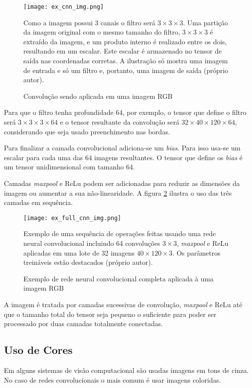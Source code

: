\begin{figure}[!htb]
	\centering
	\texttt{[image: ex\_cnn\_img.png]}
	\caption{Convolução sendo aplicada em uma imagem RGB}
	\label{fig:ex_cnn_img}
	Como a imagem possui 3 canais o filtro será $3 \times 3 \times 3$.
	Uma partição da imagem original com o mesmo tamanho do filtro,
	$3 \times 3 \times 3$ é extraído da imagem, e um
	produto interno é realizado entre os dois, resultando em um escalar. Este
	escalar é armazenado no tensor de saída nas coordenadas corretas. A
	ilustração só mostra uma imagem de entrada e só um filtro e, portanto, uma
	imagem de saída (próprio autor).
\end{figure}

Para que o filtro tenha profundidade 64, por exemplo, o tensor que define o
filtro será $3 \times 3 \times 3 \times 64$ e o tensor resultante da
convolução será $32 \times 40 \times 120 \times 64$,
considerando que seja usado preenchimento nas bordas.

Para finalizar a camada convolucional adiciona-se um \emph{bias}. Para
isso usa-se um escalar para cada uma das 64 imagens resultantes. O
tensor que define os \emph{bias} é um tensor unidimensional com tamanho 64.

Camadas \emph{maxpool} e ReLu podem ser adicionadas para reduzir as
dimensões da imagem ou aumentar a sua não-linearidade. A figura
\ref{fig:ex_full_cnn_img} ilustra o uso das três camadas em sequência.

\begin{figure}[!htb]
	\centering
	\texttt{[image: ex\_full\_cnn\_img.png]}
	\caption{Exemplo de rede neural convolucional completa aplicada à uma imagem
	RGB}
	\label{fig:ex_full_cnn_img}
	Exemplo de uma sequência de operações feitas usando uma rede neural
	convolucional incluindo 64 convoluções $3 \times 3$, \emph{maxpool} e
	ReLu aplicadas em uma
	lote de 32 imagens $40 \times 120 \times 3$. Os parâmetros treináveis
	estão destacados (próprio autor).
\end{figure}

A imagem é tratada por camadas sucessivas de convolução, \emph{maxpool} e
ReLu até que
o tamanho total do tensor seja pequeno o suficiente para poder ser processado
por duas camadas totalmente conectadas. 

\subsection{Uso de Cores}
Em alguns sistemas de visão computacional são usadas imagens em
tons de cinza. No caso de redes convolucionais o mais comum é usar
imagens coloridas.

